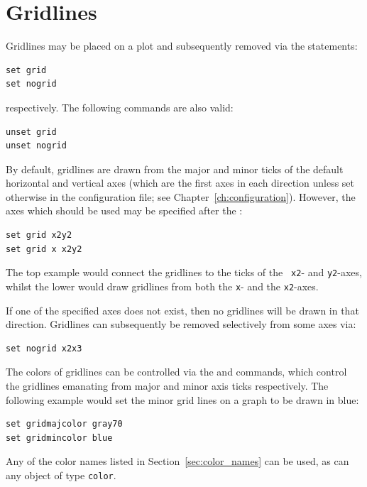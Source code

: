 \section{Gridlines}

Gridlines may be placed on a plot and subsequently removed via the statements:

\begin{verbatim}
set grid
set nogrid
\end{verbatim}

\noindent respectively. The following commands are also valid:

\begin{verbatim}
unset grid
unset nogrid
\end{verbatim}

\noindent By default, gridlines are drawn from the major and minor ticks of the
default horizontal and vertical axes (which are the first axes in each
direction unless set otherwise in the configuration file; see
Chapter~\ref{ch:configuration}).  However, the axes which should be used may be
specified after the :

\begin{verbatim}
set grid x2y2
set grid x x2y2
\end{verbatim}

\noindent The top example would connect the gridlines to the ticks of the {\tt
x2}- and {\tt y2}-axes, whilst the lower would draw gridlines from both the
{\tt x}- and the {\tt x2}-axes.

If one of the specified axes does not exist, then no gridlines will be drawn in
that direction.  Gridlines can subsequently be removed selectively from some
axes via:

\begin{verbatim}
set nogrid x2x3
\end{verbatim}

\label{sec:set_colors}
The colors of gridlines can be
controlled via the  and  commands, which control the gridlines emanating from major and
minor axis ticks respectively. The following example would set the minor grid
lines on a graph to be drawn in blue:

\begin{verbatim}
set gridmajcolor gray70
set gridmincolor blue
\end{verbatim}

\noindent Any of the color names listed in Section~\ref{sec:color_names} can
be used, as can any object of type {\tt color}.

